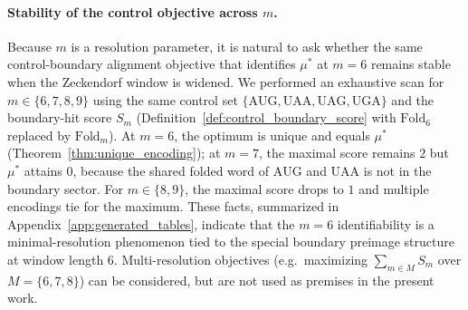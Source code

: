\paragraph{Stability of the control objective across $m$.}
Because $m$ is a resolution parameter, it is natural to ask whether the same control-boundary alignment objective that identifies $\mu^\ast$ at $m=6$ remains stable when the Zeckendorf window is widened.
We performed an exhaustive scan for $m\in\{6,7,8,9\}$ using the same control set $\{\mathrm{AUG,UAA,UAG,UGA}\}$ and the boundary-hit score $S_m$ (Definition~\ref{def:control_boundary_score} with $\mathrm{Fold}_6$ replaced by $\mathrm{Fold}_m$).
At $m=6$, the optimum is unique and equals $\mu^\ast$ (Theorem~\ref{thm:unique_encoding}); at $m=7$, the maximal score remains $2$ but $\mu^\ast$ attains $0$, because the shared folded word of $\mathrm{AUG}$ and $\mathrm{UAA}$ is not in the boundary sector.
For $m\in\{8,9\}$, the maximal score drops to $1$ and multiple encodings tie for the maximum.
These facts, summarized in Appendix~\ref{app:generated_tables}, indicate that the $m=6$ identifiability is a minimal-resolution phenomenon tied to the special boundary preimage structure at window length $6$.
Multi-resolution objectives (e.g.\ maximizing $\sum_{m\in M} S_m$ over $M=\{6,7,8\}$) can be considered, but are not used as premises in the present work.
\begin{center}

\end{center}

